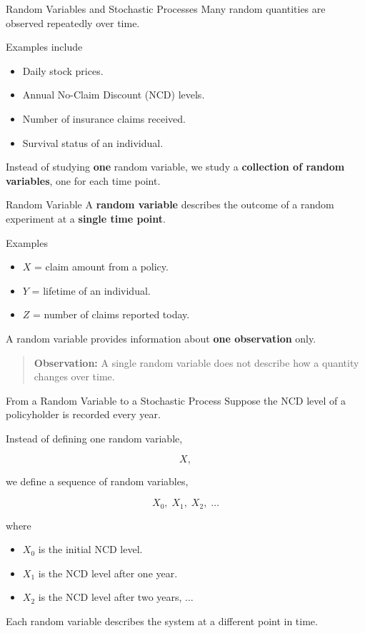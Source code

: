 \documentclass[
  ignorenonframetext,
  aspectratio=169,
]{beamer}
\providecommand{\tightlist}{%
  \setlength{\itemsep}{0pt}\setlength{\parskip}{0pt}}
\begin{document}
\begin{frame}{Random Variables and Stochastic Processes}
\protect{}\label{random-variables-and-stochastic-processes}
Many random quantities are observed repeatedly over time.

Examples include

\begin{itemize}
\tightlist
\item
  Daily stock prices.
\item
  Annual No-Claim Discount (NCD) levels.
\item
  Number of insurance claims received.
\item
  Survival status of an individual.
\end{itemize}

Instead of studying \textbf{one} random variable, we study a
\textbf{collection of random variables}, one for each time point.
\end{frame}

\begin{frame}{Random Variable}
\protect{}\label{random-variable}
A \textbf{random variable} describes the outcome of a random experiment
at a \textbf{single time point}.

Examples

\begin{itemize}
\tightlist
\item
  \(X\) = claim amount from a policy.
\item
  \(Y\) = lifetime of an individual.
\item
  \(Z\) = number of claims reported today.
\end{itemize}

A random variable provides information about \textbf{one observation}
only.

\begin{quote}
\textbf{Observation:} A single random variable does not describe how a
quantity changes over time.
\end{quote}
\end{frame}

\begin{frame}{From a Random Variable to a Stochastic Process}
\protect{}\label{from-a-random-variable-to-a-stochastic-process}
Suppose the NCD level of a policyholder is recorded every year.

Instead of defining one random variable,

\[
X,
\]

we define a sequence of random variables,

\[
X_0,\;X_1,\;X_2,\;\ldots
\]

where

\begin{itemize}
\tightlist
\item
  \(X_0\) is the initial NCD level.
\item
  \(X_1\) is the NCD level after one year.
\item
  \(X_2\) is the NCD level after two years, \(\ldots\)
\end{itemize}

Each random variable describes the system at a different point in time.
\end{frame}
\end{document}
